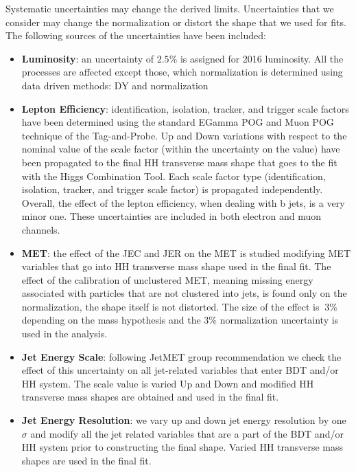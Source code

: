 
Systematic uncertainties may change the derived limits. Uncertainties
that we consider may change the normalization or distort the shape
that we used for fits. The following sources of the uncertainties have
been included:
\begin{itemize}

 \item {\bf Luminosity}: an uncertainty of $2.5\%$ is assigned for
   2016 luminosity. All the processes are affected except those, which normalization is determined using data driven methods: DY and \ttbar normalization

 \item {\bf Lepton Efficiency}: identification, isolation, tracker,
   and trigger scale factors have been determined using the standard EGamma POG and Muon POG technique of the Tag-and-Probe. 
   Up and Down variations with respect to the nominal value of the scale factor (within the uncertainty on the value) have been propagated to the final HH transverse mass shape that goes to the fit with the Higgs Combination Tool. Each scale factor type (identification, isolation, tracker,
   and trigger scale factor) is propagated independently. Overall, the effect of the lepton efficiency, when dealing with b jets, is a very minor
   one.  These uncertainties are included in both electron and muon channels.

 \item {\bf MET}: the effect of the JEC and JER on the MET is studied modifying MET variables that go into HH transverse mass shape used in the final fit. The effect of the calibration of unclustered MET, meaning missing energy associated with particles that are not clustered into jets, is found only on the normalization, the shape itself is not distorted. The size of the effect is $~3\%$ depending on the mass hypothesis and the $3\%$ normalization uncertainty is used in the analysis.

 \item {\bf Jet Energy Scale}: following JetMET group recommendation we check the effect of this uncertainty
   on all jet-related variables that enter BDT and/or HH system. The scale value is varied Up and Down and modified HH
   transverse mass shapes are obtained and used in the final fit.

 \item {\bf Jet Energy Resolution}: we vary up and down jet energy
   resolution by one $\sigma$ and modify all the jet related
   variables that are a part of the BDT and/or HH system prior to constructing the final shape. Varied HH transverse mass shapes are used in the final fit.


\end{itemize}
